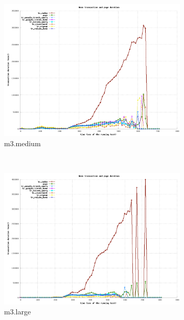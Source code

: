\documentclass[dvips,12pt]{article}
\begin{document}
\begin{figure}[h!]
    \centering
    \begin{subfigure}[b]{0.3\textwidth}
        \includegraphics[width=\textwidth]{images/vertical/transaction_medium.png}
        \caption{m3.medium}
    \end{subfigure}
    ~ 
    \begin{subfigure}[b]{0.3\textwidth}
        \includegraphics[width=\textwidth]{images/vertical/transaction_large.png}
        \caption{m3.large}
    \end{subfigure}
    ~ 
    \begin{subfigure}[b]{0.3\textwidth}

\end{subfigure}
\end{figure}
\end{document}
